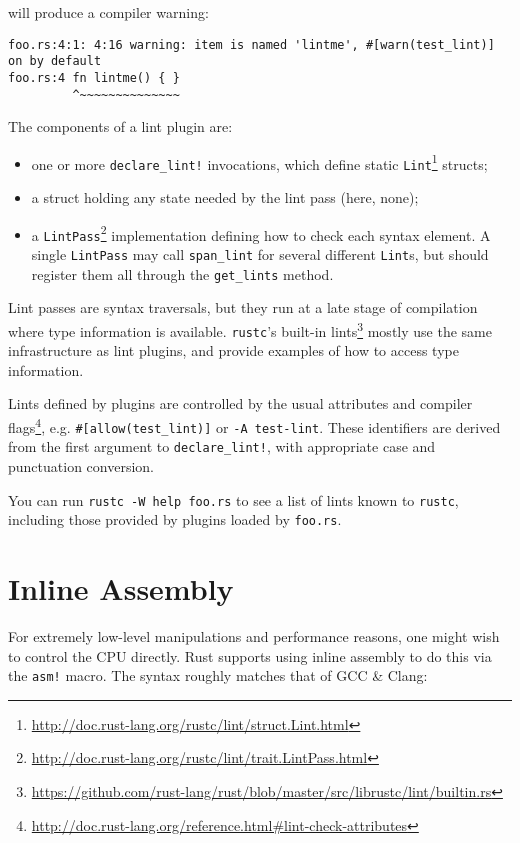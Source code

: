 \documentclass[a4paper,]{book}
\renewcommand{\href}[2]{#2\footnote{\url{#1}}}
\begin{document}
will produce a compiler warning:

\begin{verbatim}
foo.rs:4:1: 4:16 warning: item is named 'lintme', #[warn(test_lint)] on by default
foo.rs:4 fn lintme() { }
         ^~~~~~~~~~~~~~~
\end{verbatim}

The components of a lint plugin are:

\begin{itemize}
\item
  one or more \texttt{declare\_lint!} invocations, which define static
  \href{http://doc.rust-lang.org/rustc/lint/struct.Lint.html}{\texttt{Lint}}
  structs;
\item
  a struct holding any state needed by the lint pass (here, none);
\item
  a
  \href{http://doc.rust-lang.org/rustc/lint/trait.LintPass.html}{\texttt{LintPass}}
  implementation defining how to check each syntax element. A single
  \texttt{LintPass} may call \texttt{span\_lint} for several different
  \texttt{Lint}s, but should register them all through the
  \texttt{get\_lints} method.
\end{itemize}

Lint passes are syntax traversals, but they run at a late stage of
compilation where type information is available. \texttt{rustc}'s
\href{https://github.com/rust-lang/rust/blob/master/src/librustc/lint/builtin.rs}{built-in
lints} mostly use the same infrastructure as lint plugins, and provide
examples of how to access type information.

Lints defined by plugins are controlled by the usual
\href{http://doc.rust-lang.org/reference.html\#lint-check-attributes}{attributes
and compiler flags}, e.g. \texttt{\#{[}allow(test\_lint){]}} or
\texttt{-A\ test-lint}. These identifiers are derived from the first
argument to \texttt{declare\_lint!}, with appropriate case and
punctuation conversion.

You can run \texttt{rustc\ -W\ help\ foo.rs} to see a list of lints
known to \texttt{rustc}, including those provided by plugins loaded by
\texttt{foo.rs}.

\section{Inline Assembly}\label{sec--inline-assembly}

For extremely low-level manipulations and performance reasons, one might
wish to control the CPU directly. Rust supports using inline assembly to
do this via the \texttt{asm!} macro. The syntax roughly matches that of
GCC \& Clang:
\end{document}
